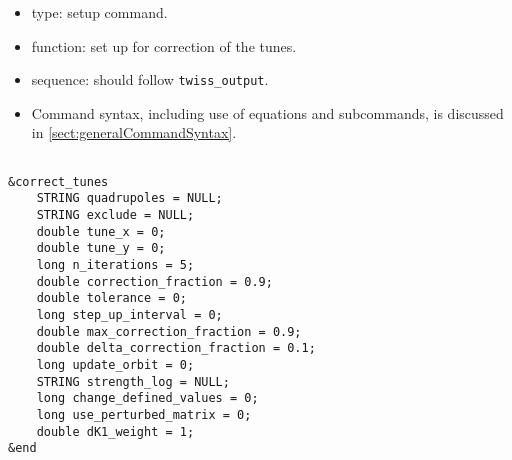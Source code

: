 \documentclass[11pt]{article}
\begin{document}
\begin{itemize}
\item type: setup command.
\item function: set up for correction of the tunes.
\item sequence: should follow \verb|twiss_output|.
\item Command syntax, including use of equations and subcommands, is discussed in \ref{sect:generalCommandSyntax}.
\end{itemize}

\begin{verbatim}

&correct_tunes
    STRING quadrupoles = NULL;
    STRING exclude = NULL;
    double tune_x = 0;
    double tune_y = 0;
    long n_iterations = 5;
    double correction_fraction = 0.9;
    double tolerance = 0;
    long step_up_interval = 0;
    double max_correction_fraction = 0.9;
    double delta_correction_fraction = 0.1;
    long update_orbit = 0;
    STRING strength_log = NULL;
    long change_defined_values = 0;
    long use_perturbed_matrix = 0;
    double dK1_weight = 1;
&end
\end{verbatim}
\end{document}
